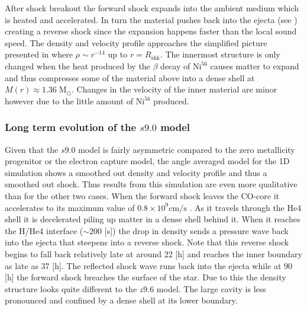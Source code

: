 \documentclass[fleqn,usenatbib]{mnras}
\newcommand{\nickel}{$\mathrm{Ni^{56}}$\xspace}
\begin{document}
After shock breakout the forward shock expands into the ambient medium which is heated and accelerated. In turn the material pushes back into the ejecta (see \citet{Truelove1999}) creating a reverse shock since the expansion happens faster than the local sound speed. The density and velocity profile approaches the simplified picture presented in \citet{Truelove1999} where  $\rho \sim r^{-14}$ up to $r=R_{\mathrm{shk}}$. 
The innermost structure is only changed when the heat produced by the $\beta$ decay of \nickel causes matter to expand and thus compresses some of the material above into a dense shell at $M(r)\approx 1.36\; \mathrm{M_{\odot}}$. Changes in the velocity of the inner material are minor however due to the little amount of \nickel produced.

\subsubsection{Long term evolution of the $s9.0$ model}
Given that the $s9.0$ model is fairly asymmetric compared to the zero metallicity progenitor or the electron capture model, the angle averaged model for the 1D simulation shows a smoothed out density and velocity profile and thus a smoothed out shock. Thus results from this simulation are even more qualitative than for the other two cases.
When the forward shock leaves the CO-core it accelerates to its maximum value of $0.8\times 10^{9}\mathrm{cm/s}$ . As it travels through the He4 shell it is decelerated piling up matter in a dense shell behind it. When it reaches the H/He4 interface ($\sim 200$ [s]) the drop in density sends a pressure wave back into the ejecta that steepens into a reverse shock. Note that this reverse shock begins to fall back relatively late at around 22 [h] and reaches the inner boundary as late as 37 [h]. The reflected shock wave runs back into the ejecta while at 90 [h] the forward shock breaches the surface of the star. Due to this the density structure looks quite different to the $z9.6$ model. The large cavity is less pronounced and confined by a dense shell at its lower boundary. 
\end{document}
